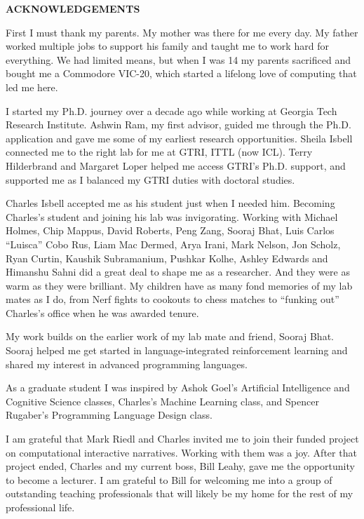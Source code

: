 \clearpage
\begin{centering}
\textbf{ACKNOWLEDGEMENTS}\\
\vspace{\baselineskip}
\end{centering}


First I must thank my parents. My mother was there for me every day. My father worked multiple jobs to support his family and taught me to work hard for everything. We had limited means, but when I was 14 my parents sacrificed and bought me a Commodore VIC-20, which started a lifelong love of computing that led me here.

I started my Ph.D. journey over a decade ago while working at Georgia Tech Research Institute. Ashwin Ram, my first advisor, guided me through the Ph.D. application and gave me some of my earliest research opportunities. Sheila Isbell connected me to the right lab for me at GTRI, ITTL (now ICL). Terry Hilderbrand and Margaret Loper helped me access GTRI's Ph.D. support, and supported me as I balanced my GTRI duties with doctoral studies.

Charles Isbell accepted me as his student just when I needed him. Becoming Charles's student and joining his lab was invigorating. Working with Michael Holmes, Chip Mappus, David Roberts, Peng Zang, Sooraj Bhat, Luis Carlos ``Luisca'' Cobo Rus, Liam Mac Dermed, Arya Irani, Mark Nelson, Jon Scholz, Ryan Curtin, Kaushik Subramanium, Pushkar Kolhe, Ashley Edwards and Himanshu Sahni did a great deal to shape me as a researcher.  And they were as warm as they were brilliant. My children have as many fond memories of my lab mates as I do, from Nerf fights to cookouts to chess matches to ``funking out'' Charles's office when he was awarded tenure.

My work builds on the earlier work of my lab mate and friend, Sooraj Bhat. Sooraj helped me get started in language-integrated reinforcement learning and shared my interest in advanced programming languages.

As a graduate student I was inspired by Ashok Goel's Artificial Intelligence and Cognitive Science classes, Charles's Machine Learning class, and Spencer Rugaber's Programming Language Design class.

\newpage

I am grateful that Mark Riedl and Charles invited me to join their funded project on computational interactive narratives. Working with them was a joy. After that project ended, Charles and my current boss, Bill Leahy, gave me the opportunity to become a lecturer. I am grateful to Bill for welcoming me into a group of outstanding teaching professionals that will likely be my home for the rest of my professional life.

